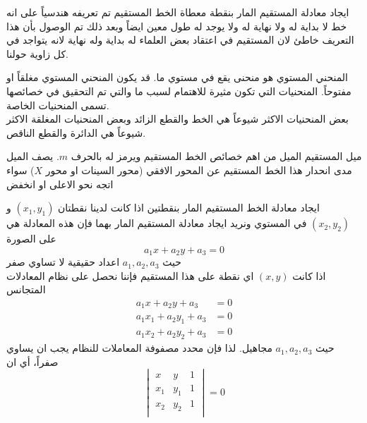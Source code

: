     \begin{frame}
    	\begin{exampleblock}{ايجاد معادلة المستقيم المار بنقطة معطاة}
    		الخط المستقيم تم تعريفه هندسياً على انه خط لا بداية له ولا نهاية له ولا يوجد له طول معين ايضاً وبعد ذلك تم الوصول بأن هذا التعريف خاطئ لان المستقيم في اعتقاد بعض العلماء له بداية وله نهاية لانه يتواجد في كل زاوية حولنا.
    	\end{exampleblock}
    	
    	\begin{exampleblock}{المنحني المستوي}
    		هو منحنى يقع في مستوي ما. قد يكون المنحني المستوي مغلقاً او مفتوحاً. المنحنيات التي تكون مثيرة للاهتمام لسبب ما والتي تم التحقيق في خصائصها تسمى المنحنيات الخاصة.\\
    		بعض المنحنيات الاكثر شيوعاً هي الخط والقطع الزائد وبعض المنحنيات المغلقة الاكثر شيوعاً هي الدائرة والقطع الناقص.
    	\end{exampleblock}
    	
    	\begin{exampleblock}{ميل المستقيم}
    		الميل من اهم خصائص الخط المستقيم ويرمز له بالحرف $m$. يصف الميل مدى انحدار
    		هذا الخط المستقيم عن المحور الافقي (محور السينات او محور $X$) سواء اتجه نحو الاعلى  او انخفض
    	\end{exampleblock}
    \end{frame}
    
    \begin{frame}
    	\begin{exampleblock}{ايجاد معادلة الخط المستقيم المار بنقطتين}
    		اذا كانت لدينا نقطتان $(x_1, y_1)$ و $(x_2, y_2)$ في المستوي ونريد ايجاد معادلة المستقيم المار بهما فإن هذه المعادلة هي على الصورة
    		\[
    		a_1 x + a_2 y + a_3 = 0
    		\]
    		حيث $a_1,a_2,a_3$ اعداد حقيقية لا تساوي صفر\\
    		اذا كانت $(x,y)$ اي نقطة على هذا المستقيم فإننا نحصل على نظام المعادلات المتجانس
    		\begin{align*}
    			a_1 x + a_2 y + a_3 &= 0\\
    			a_1 x_1 + a_2 y_1 + a_3 &= 0\\
    			a_1 x_2 + a_2 y_2 + a_3 &= 0
    		\end{align*}
    		حيث $a_1, a_2, a_3$ مجاهيل. لذا فإن محدد مصفوفة المعاملات للنظام يجب ان يساوي صفراً، أي ان
    		\[
    		\begin{vmatrix}
    			x & y & 1\\
    			x_1 & y_1 & 1\\
    			x_2 & y_2 & 1\\
    		\end{vmatrix} =0
    		\]
    	\end{exampleblock}
    \end{frame}
    
